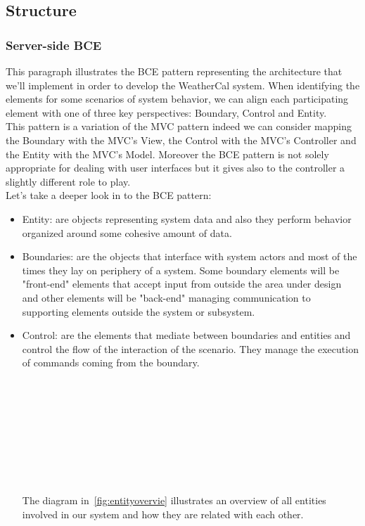 \subsection{Structure}
\subsubsection{Server-side BCE}\label{sec:BCE}
This paragraph illustrates the BCE pattern representing the architecture that we'll implement in order to develop the WeatherCal system. When identifying the elements for some scenarios of system behavior, we can align each participating element with one of three key perspectives: Boundary, Control and Entity. \\This  pattern is a variation of the MVC pattern indeed we can consider mapping the Boundary with the MVC's View, the Control with the MVC's Controller and the Entity with the MVC's Model. Moreover the BCE pattern is not solely appropriate for dealing with user interfaces but it gives also to the controller a slightly different role to play.\\Let's take a deeper look in to the BCE pattern:\begin{itemize}\addtolength{\itemsep}{-.35\baselineskip} 
\item Entity: are objects representing system data and also they perform behavior organized around some cohesive amount of data.
\item Boundaries: are the objects that interface with system actors and most of the times they lay on periphery of a system. Some boundary elements will be "front-end" elements that accept input from outside the area under design and other elements will be "back-end" managing communication to supporting elements outside the system or subsystem.
\item Control: are the elements that mediate between boundaries and entities and control the flow of the interaction of the scenario. They manage the execution of commands coming from the boundary.\\\\\\\\\\\\\\\\\\\\
The diagram in~\ref{fig:entityovervie} illustrates an overview of all entities involved in our system and how they are related with each other.

\end{itemize}
